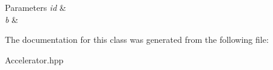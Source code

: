 \begin{DoxyParams}{Parameters}
{\em id} & \\
\hline
{\em b} & \\
\hline
\end{DoxyParams}


The documentation for this class was generated from the following file\+:\begin{DoxyCompactItemize}
\item 
Accelerator.\+hpp\end{DoxyCompactItemize}
